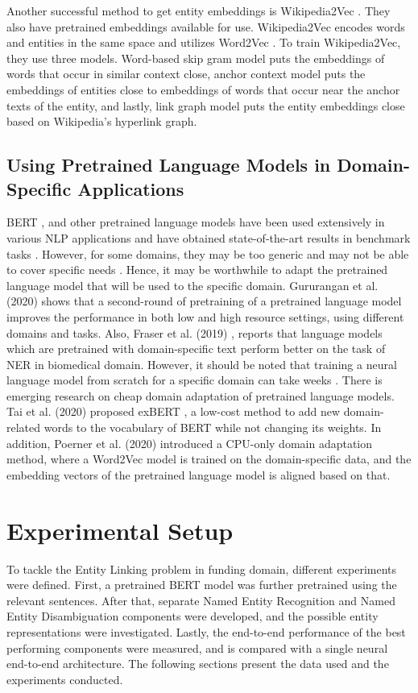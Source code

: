 \documentclass{article}
\theoremstyle{definition}
\theoremstyle{remark}
\begin{document}
Another successful method to get entity embeddings is Wikipedia2Vec \cite{wikipedia2vec2}. They also have pretrained embeddings available for use. Wikipedia2Vec encodes words and entities in the same space and utilizes Word2Vec \cite{w2v}. To train Wikipedia2Vec, they use three models. Word-based skip gram model puts the embeddings of words that occur in similar context close, anchor context model puts the embeddings of entities close to embeddings of words that occur near the anchor texts of the entity, and lastly, link graph model puts the entity embeddings close based on Wikipedia's hyperlink graph. 


\subsection{Using Pretrained Language Models in Domain-Specific Applications}
\label{preLMDiffDomain}
BERT \cite{BERT}, and other pretrained language models have been used extensively in various NLP applications and have obtained state-of-the-art results in benchmark tasks \cite{pretrainedLM}. However, for some domains, they may be too generic and may not be able to cover specific needs \cite{quote2}. Hence, it may be worthwhile to adapt the pretrained language model that will be used to the specific domain. Gururangan et al. (2020) \cite{DontStop} shows that a second-round of pretraining of a pretrained language model improves the performance in both low and high resource settings, using different domains and tasks. Also, Fraser et al. (2019) \cite{quote3}, reports that language models which are pretrained with domain-specific text perform better on the task of NER in biomedical domain. However, it should be noted that training a neural language model from scratch for a specific domain can take weeks \cite{tritrain}. There is emerging research on cheap domain adaptation of pretrained language models. Tai et al. (2020) proposed exBERT \cite{exBERT}, a low-cost method to add new domain-related words to the vocabulary of BERT \cite{BERT} while not changing its weights. In addition, Poerner et al. (2020) \cite{word2vectoBERT} introduced a CPU-only domain adaptation method, where a Word2Vec \cite{w2v} model is trained on the domain-specific data, and the embedding vectors of the pretrained language model is aligned based on that.

\newpage
\section{Experimental Setup}
To tackle the Entity Linking problem in funding domain, different experiments were defined. First, a pretrained BERT \cite{BERT} model was further pretrained using the relevant sentences. After that, separate Named Entity Recognition and Named Entity Disambiguation components were developed, and the possible entity representations were investigated. Lastly, the end-to-end performance of the best performing components were measured, and is compared with a single neural end-to-end architecture. The following sections present the data used and the experiments conducted.
\end{document}
